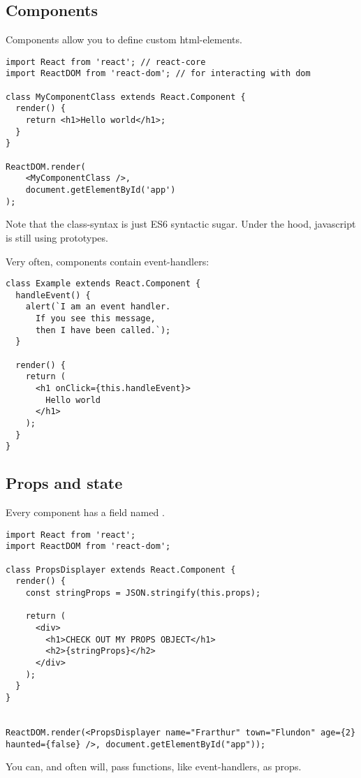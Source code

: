 \subsection{Components}
Components allow you to define custom html-elements. 
\begin{lstlisting}
import React from 'react'; // react-core
import ReactDOM from 'react-dom'; // for interacting with dom

class MyComponentClass extends React.Component {
  render() {
    return <h1>Hello world</h1>;
  }
}

ReactDOM.render(
	<MyComponentClass />, 
	document.getElementById('app')
);
\end{lstlisting}
Note that the  class-syntax is just ES6 syntactic sugar. Under the hood, javascript is still using prototypes.

Very often, components contain event-handlers:
\begin{lstlisting}
class Example extends React.Component {
  handleEvent() {
    alert(`I am an event handler.
      If you see this message,
      then I have been called.`);
  }

  render() {
    return (
      <h1 onClick={this.handleEvent}>
        Hello world
      </h1>
    );
  }
}
\end{lstlisting}

\subsection{Props and state}
Every component has a field named .
\begin{lstlisting}
import React from 'react';
import ReactDOM from 'react-dom';

class PropsDisplayer extends React.Component {
  render() {
  	const stringProps = JSON.stringify(this.props);

    return (
      <div>
        <h1>CHECK OUT MY PROPS OBJECT</h1>
        <h2>{stringProps}</h2>
      </div>
    );
  }
}


ReactDOM.render(<PropsDisplayer name="Frarthur" town="Flundon" age={2} haunted={false} />, document.getElementById("app"));
\end{lstlisting}

You can, and often will, pass functions, like event-handlers, as props. 
